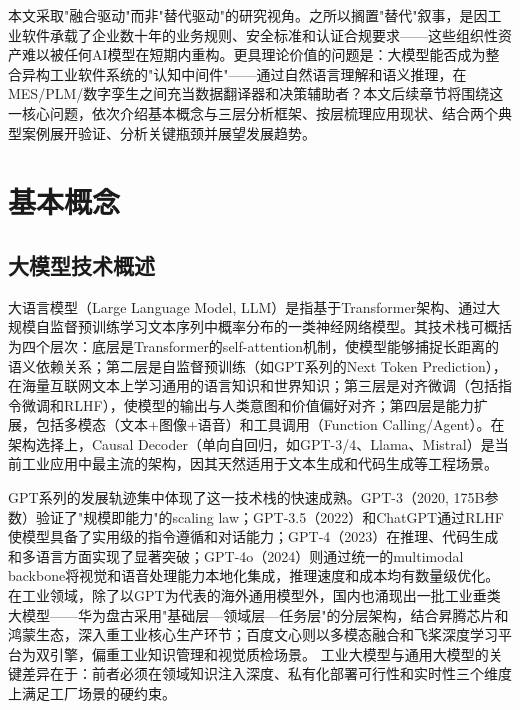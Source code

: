 \documentclass[12pt,a4paper]{ctexart}
\begin{document}
本文采取"融合驱动"而非"替代驱动"的研究视角。之所以搁置"替代"叙事，是因工业软件承载了企业数十年的业务规则、安全标准和认证合规要求——这些组织性资产难以被任何AI模型在短期内重构。更具理论价值的问题是：大模型能否成为整合异构工业软件系统的"认知中间件"——通过自然语言理解和语义推理，在MES/PLM/数字孪生之间充当数据翻译器和决策辅助者？本文后续章节将围绕这一核心问题，依次介绍基本概念与三层分析框架、按层梳理应用现状、结合两个典型案例展开验证、分析关键瓶颈并展望发展趋势。

\section{基本概念}

\subsection{大模型技术概述}

大语言模型（Large Language Model, LLM）是指基于Transformer架构、通过大规模自监督预训练学习文本序列中概率分布的一类神经网络模型。其技术栈可概括为四个层次：底层是Transformer的self-attention机制，使模型能够捕捉长距离的语义依赖关系；第二层是自监督预训练（如GPT系列的Next Token Prediction），在海量互联网文本上学习通用的语言知识和世界知识；第三层是对齐微调（包括指令微调和RLHF），使模型的输出与人类意图和价值偏好对齐；第四层是能力扩展，包括多模态（文本+图像+语音）和工具调用（Function Calling/Agent）。在架构选择上，Causal Decoder（单向自回归，如GPT-3/4、Llama、Mistral）是当前工业应用中最主流的架构，因其天然适用于文本生成和代码生成等工程场景。\cite{ieee2024llmindustrial}

GPT系列的发展轨迹集中体现了这一技术栈的快速成熟。GPT-3（2020, 175B参数）验证了"规模即能力"的scaling law；GPT-3.5（2022）和ChatGPT通过RLHF使模型具备了实用级的指令遵循和对话能力；GPT-4（2023）在推理、代码生成和多语言方面实现了显著突破；GPT-4o（2024）则通过统一的multimodal backbone将视觉和语音处理能力本地化集成，推理速度和成本均有数量级优化。在工业领域，除了以GPT为代表的海外通用模型外，国内也涌现出一批工业垂类大模型——华为盘古采用"基础层—领域层—任务层"的分层架构，结合昇腾芯片和鸿蒙生态，深入重工业核心生产环节；百度文心则以多模态融合和飞桨深度学习平台为双引擎，偏重工业知识管理和视觉质检场景。\cite{mdpi2025llmdigital,jms2025llmindustry5} 工业大模型与通用大模型的关键差异在于：前者必须在领域知识注入深度、私有化部署可行性和实时性三个维度上满足工厂场景的硬约束。
\end{document}
